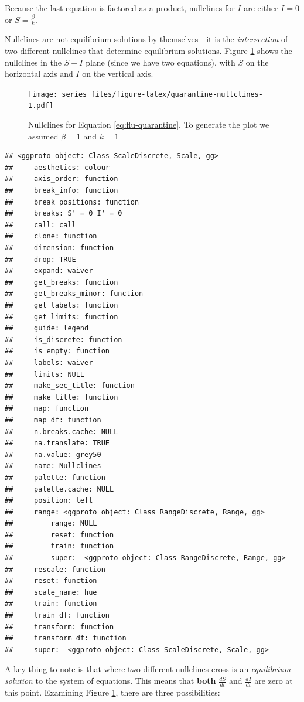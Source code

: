 \documentclass[
]{book}
\theoremstyle{definition}
\theoremstyle{definition}
\theoremstyle{definition}
\theoremstyle{remark}
\begin{document}
Because the last equation is factored as a product, nullclines for \(I\) are either \(I=0\) or \(\displaystyle S = \frac{\beta}{k}\).

Nullclines are not equilibrium solutions by themselves - it is the \emph{intersection} of two different nullclines that determine equilibrium solutions. Figure \ref{fig:quarantine-nullclines} shows the nullclines in the \(S-I\) plane (since we have two equations), with \(S\) on the horizontal axis and \(I\) on the vertical axis.

\begin{figure}
\centering
\texttt{[image: series\_files/figure-latex/quarantine-nullclines-1.pdf]}
\caption{\label{fig:quarantine-nullclines}Nullclines for Equation \eqref{eq:flu-quarantine}. To generate the plot we assumed \(\beta=1\) and \(k=1\)}
\end{figure}

\begin{verbatim}
## <ggproto object: Class ScaleDiscrete, Scale, gg>
##     aesthetics: colour
##     axis_order: function
##     break_info: function
##     break_positions: function
##     breaks: S' = 0 I' = 0
##     call: call
##     clone: function
##     dimension: function
##     drop: TRUE
##     expand: waiver
##     get_breaks: function
##     get_breaks_minor: function
##     get_labels: function
##     get_limits: function
##     guide: legend
##     is_discrete: function
##     is_empty: function
##     labels: waiver
##     limits: NULL
##     make_sec_title: function
##     make_title: function
##     map: function
##     map_df: function
##     n.breaks.cache: NULL
##     na.translate: TRUE
##     na.value: grey50
##     name: Nullclines
##     palette: function
##     palette.cache: NULL
##     position: left
##     range: <ggproto object: Class RangeDiscrete, Range, gg>
##         range: NULL
##         reset: function
##         train: function
##         super:  <ggproto object: Class RangeDiscrete, Range, gg>
##     rescale: function
##     reset: function
##     scale_name: hue
##     train: function
##     train_df: function
##     transform: function
##     transform_df: function
##     super:  <ggproto object: Class ScaleDiscrete, Scale, gg>
\end{verbatim}

A key thing to note is that where two different nullclines cross is an \emph{equilibrium solution} to the system of equations. This means that \textbf{both} \(\displaystyle \frac{dS}{dt}\) and \(\displaystyle \frac{dI}{dt}\) are zero at this point. Examining Figure \ref{fig:quarantine-nullclines}, there are three possibilities:
\end{document}
